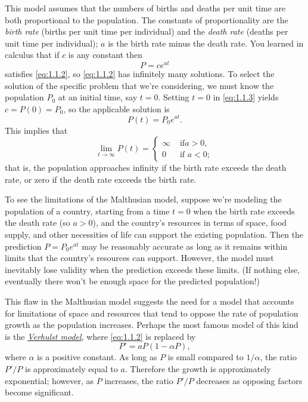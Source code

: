 \documentclass{ximera}
\begin{document}
This model assumes that the numbers of births and deaths per unit time
are both proportional to the population. The constants of
proportionality are  the \textit{birth rate} (births per unit
time per individual) and the \textit{death rate} (deaths per unit time
per individual);     $a$ is the birth rate minus the death rate.
You  learned in calculus that if $c$ is any constant then
\begin{equation} \label{eq:1.1.3}
P=ce^{at}
\end{equation}
satisfies \eqref{eq:1.1.2}, so \eqref{eq:1.1.2} has infinitely
many solutions. To select the solution of the specific problem that
we're considering, we must know the population $P_0$ at an initial
time, say $t=0$. Setting $t=0$ in \eqref{eq:1.1.3} yields
$c=P(0)=P_0$, so the applicable solution is
$$
P(t)=P_0e^{at}.
$$
This implies that
$$
\lim_{t\rightarrow\infty}P(t)=\left\{\begin{array}{cl}\infty&\mbox{ if
}a>0,\\ 0&\mbox{ if }a<0;    \end{array}\right.
$$
that is, the population approaches infinity if the birth rate exceeds
the death rate, or zero if the death rate exceeds the birth rate.

To see the limitations of the Malthusian model, suppose  we're
modeling the  population of a country, starting from a time
$t=0$ when the birth rate exceeds the death rate (so $a>0$), and
the country's resources in terms of space, food supply, and other
necessities of life can support the existing population. Then the
prediction $P=P_0e^{at}$ may be reasonably accurate as long as
it remains within limits that the country's resources can support.
However, the model must inevitably lose validity when the prediction
exceeds these limits. (If nothing else, eventually there won't be
enough space for the predicted population!)

This flaw in the Malthusian model suggests the need for a model that
accounts for limitations of space and resources that tend to oppose
the rate of population growth as the population increases.
 Perhaps the most famous model of this kind is the
\href{http://www-history.mcs.st-and.ac.uk/Mathematicians/Verhulst.html}
{\textit{Verhulst
 model}}, where \eqref{eq:1.1.2} is
replaced by
\begin{equation} \label{eq:1.1.4}
P'=aP(1-\alpha P),
\end{equation}
where $\alpha$ is a positive constant.
As long as $P$ is small
compared to $1/\alpha$, the ratio $P'/P$  is approximately equal to $a$.
Therefore the growth is approximately exponential;     however, as $P$
increases, the ratio $P'/P$  decreases as opposing factors
become significant.
\end{document}
